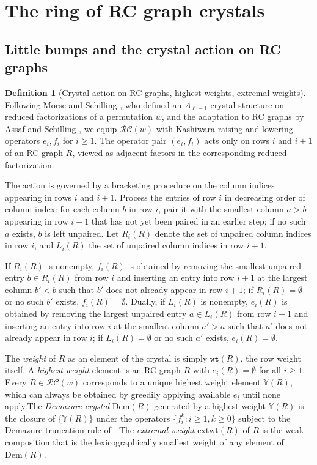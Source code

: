 \documentclass{amsart}
\theoremstyle{definition}
\newtheorem{definition}[lemma]{Definition}
\theoremstyle{remark}
\numberwithin{equation}{subsection}
\newcommand{\wtt}{\mathtt{wt}}
\newcommand{\RC}{\mathcal{RC}}
\newcommand{\dsch}{\ensuremath{\Xi}}
\newcommand{\dcoma}{\mathcal{D}}
\begin{document}

\section{The ring of RC graph crystals}

\subsection{Little bumps and the crystal action on RC graphs}

\begin{definition}[Crystal action on RC graphs, highest weights, extremal weights] \label{definition:crystal}
Following Morse and Schilling \cite{morse2016crystal}, who defined an $A_{\ell-1}$-crystal structure on reduced factorizations of a permutation $w$, and the adaptation to RC graphs by Assaf and Schilling \cite{assaf2018demazure}, we equip $\RC(w)$ with Kashiwara raising and lowering operators $e_i, f_i$ for $i\geq 1$. The operator pair $(e_i, f_i)$ acts only on rows $i$ and $i+1$ of an RC graph $R$, viewed as adjacent factors in the corresponding reduced factorization.

The action is governed by a bracketing procedure on the column indices appearing in rows $i$ and $i+1$. Process the entries of row $i$ in decreasing order of column index: for each column $b$ in row $i$, pair it with the smallest column $a>b$ appearing in row $i+1$ that has not yet been paired in an earlier step; if no such $a$ exists, $b$ is left unpaired. Let $R_i(R)$ denote the set of unpaired column indices in row $i$, and $L_i(R)$ the set of unpaired column indices in row $i+1$.

If $R_i(R)$ is nonempty, $f_i(R)$ is obtained by removing the smallest unpaired entry $b\in R_i(R)$ from row $i$ and inserting an entry into row $i+1$ at the largest column $b' < b$ such that $b'$ does not already appear in row $i+1$; if $R_i(R) = \emptyset$ or no such $b'$ exists, $f_i(R) = \emptyset$. Dually, if $L_i(R)$ is nonempty, $e_i(R)$ is obtained by removing the largest unpaired entry $a\in L_i(R)$ from row $i+1$ and inserting an entry into row $i$ at the smallest column $a' > a$ such that $a'$ does not already appear in row $i$; if $L_i(R) = \emptyset$ or no such $a'$ exists, $e_i(R) = \emptyset$.

The \emph{weight} of $R$ as an element of the crystal is simply $\wtt(R)$, the row weight itself. A \emph{highest weight} element is an RC graph $R$ with $e_i(R) = \emptyset$ for all $i\geq 1$. Every $R\in \RC(w)$ corresponds to a unique highest weight element $\mathbb{Y}(R)$, which can always be obtained by greedily applying available $e_i$ until none apply.The \emph{Demazure crystal} $\mathrm{Dem}(R)$ generated by a highest weight $\mathbb{Y}(R)$ is the closure of $\{\mathbb{Y}(R)\}$ under the operators $\{f_i^k : i\geq 1, k\geq 0\}$ subject to the Demazure truncation rule of \cite{assaf2018demazure}. The \emph{extremal weight} $\mathrm{extwt}(R)$ of $R$ is the weak composition that is the lexicographically smallest weight of any element of $\mathrm{Dem}(R)$.
\end{definition}
\end{document}
